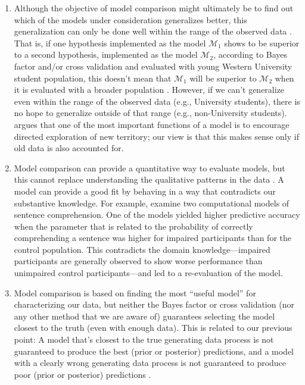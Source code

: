 \documentclass[12pt,]{krantz}
\theoremstyle{definition}
\theoremstyle{definition}
\theoremstyle{definition}
\theoremstyle{remark}
\begin{document}
\begin{enumerate}
\def\labelenumi{\arabic{enumi}.}
\item
  Although the objective of model comparison might ultimately be to find
  out which of the models under consideration generalizes better, this
  generalization can only be done well within the range of the observed
  data \citep[see][]{VehtariLampinen2002, VehtariOjanen2012}. That is,
  if one hypothesis implemented as the model \(\mathcal{M}_1\) shows to
  be superior to a second hypothesis, implemented as the model
  \(\mathcal{M}_2\), according to Bayes factor and/or cross validation
  and evaluated with young Western University student population, this
  doesn't mean that \(\mathcal{M}_1\) will be superior to
  \(\mathcal{M}_2\) when it is evaluated with a broader population
  \citep[and in fact it seems that many times it won't,
  see][]{henrich_heine_norenzayan_2010}. However, if we can't generalize
  even within the range of the observed data (e.g., University
  students), there is no hope to generalize outside of that range (e.g.,
  non-University students). \citet{navarroDevilDeepBlue2018} argues that
  one of the most important functions of a model is to encourage
  directed exploration of new territory; our view is that this makes
  sense only if old data is also accounted for.
\item
  Model comparison can provide a quantitative way to evaluate models,
  but this cannot replace understanding the qualitative patterns in the
  data \citep[see, e.g.,][]{navarroDevilDeepBlue2018}. A model can
  provide a good fit by behaving in a way that contradicts our
  substantive knowledge. For example, \citet{lisson_2020} examine two
  computational models of sentence comprehension. One of the models
  yielded higher predictive accuracy when the parameter that is related
  to the probability of correctly comprehending a sentence was higher
  for impaired participants than for the control population. This
  contradicts the domain knowledge---impaired participants are generally
  observed to show worse performance than unimpaired control
  participants---and led to a re-evaluation of the model.
\item
  Model comparison is based on finding the most ``useful model'' for
  characterizing our data, but neither the Bayes factor or cross
  validation (nor any other method that we are aware of) guarantees
  selecting the model closest to the truth (even with enough data). This
  is related to our previous point: A model that's closest to the true
  generating data process is not guaranteed to produce the best (prior
  or posterior) predictions, and a model with a clearly wrong generating
  data process is not guaranteed to produce poor (prior or posterior)
  predictions \citetext{\citealp[see][for an example with
  cross-validation]{WangGelman2014difficulty}; \citealp[and][ for a toy
  example with Bayes factor]{navarroDevilDeepBlue2018}}.
\end{enumerate}
\end{document}
